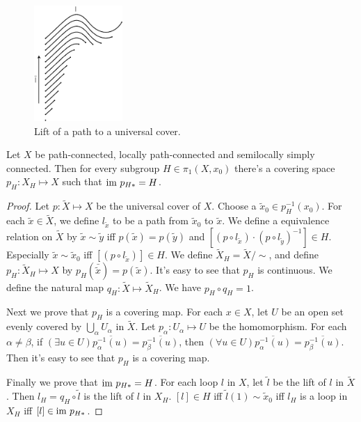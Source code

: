 \documentclass[12pt]{book}
\begin{document}
\begin{figure}[htb!]
	\centering  
	\includegraphics[width=0.3\textwidth ]{resources/chap_fund_grp/lift_to_sp.pdf}  
	\caption{Lift of a path to a universal cover.}
	\label{fig:lift_to_sp}
\end{figure}

\begin{lemma}
	Let $X$ be path-connected, locally path-connected and semilocally simply connected. Then for every subgroup $H\in \pi_1(X,x_0)$ there's a covering space $p_H:X_H\mapsto X$ such that ${\rm im}\ p_{H*}=H$.
\end{lemma}
\begin{proof}
	Let $p:\tilde X\mapsto X$ be the universal cover of $X$. Choose a $\tilde x_0\in p_H^{-1}(x_0)$. For each $\tilde x\in\tilde X$, we define $l_{\tilde x}$ to be a path from $\tilde x_0$ to $\tilde x$. We define a equivalence relation on $\tilde X$ by $\tilde x\sim \tilde y$ iff $p(\tilde x)=p(\tilde y)$ and $[(p\circ l_{\tilde x})\cdot (p\circ l_{\tilde y})^{-1}]\in H$. Especially $\tilde x\sim\tilde x_0$ iff $[(p\circ l_{\tilde x})]\in H$. We define $\tilde X_H=\tilde X/\sim$, and define $p_H:\tilde X_H\mapsto X$ by $p_H(\bar{\tilde x})=p(\tilde x)$. It's easy to see that $p_H$ is continuous. We define the natural map $q_H:\tilde X\mapsto\tilde X_H$. We have $p_H\circ q_H=1$.
	
	Next we prove that $p_H$ is a covering map. For each $x\in X$, let $U$ be an open set evenly covered by $\bigcup_\alpha U_\alpha$ in $\tilde X$. Let $p_\alpha:U_\alpha\mapsto U$ be the homomorphism. For each $\alpha\neq\beta$, if $(\exists u\in U)\overline{p_\alpha^{-1}(u)}=\overline{p_\beta^{-1}(u)}$, then $(\forall u\in U)\overline{p_\alpha^{-1}(u)}=\overline{p_\beta^{-1}(u)}$. Then it's easy to see that $p_H$ is a covering map.
	
	Finally we prove that ${\rm im}\ p_{H*}=H$. For each loop $l$ in $X$, let $\tilde l$ be the lift of $l$ in $\tilde X$. Then $l_H=q_H\circ \tilde l$ is the lift of $l$ in $X_H$. $[l]\in H$ iff  $\tilde l(1)\sim \tilde x_0$ iff $l_H$ is a loop in $X_H$ iff $[l]\in {\rm im}\ p_{H*}$.
\end{proof}
\end{document}
